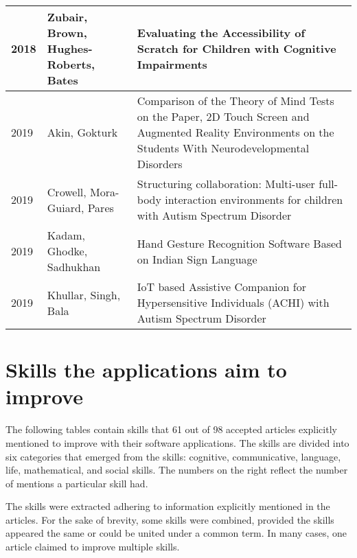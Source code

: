 \documentclass[utf8,english]{gradu3}
\begin{document}
\begin{longtable}{|>{\scriptsize}l|>{\scriptsize}p{3cm}|>{\scriptsize}p{10.4cm}|}
  2018          & Zubair, Brown, Hughes-Roberts, Bates                         & Evaluating the Accessibility of Scratch for Children with Cognitive Impairments                                                                                                                                                \\ \hline
  2019          & Akin, Gokturk                                                & Comparison of the Theory of Mind Tests on the Paper, 2D Touch Screen and Augmented Reality Environments on the Students With Neurodevelopmental Disorders                                                                      \\ \hline
  2019          & Crowell, Mora-Guiard, Pares                                  & Structuring collaboration: Multi-user full-body interaction environments for children with Autism Spectrum Disorder                                                                                                            \\ \hline
  2019          & Kadam, Ghodke, Sadhukhan                                     & Hand Gesture Recognition Software Based on Indian Sign Language                                                                                                                                                                \\ \hline
  2019          & Khullar, Singh, Bala                                         & IoT based Assistive Companion for Hypersensitive Individuals (ACHI) with Autism Spectrum Disorder                                                                                                                              \\
\end{longtable}

\section{Skills the applications aim to improve} \label{appendixC}

\begin{footnotesize}
  The following tables contain skills that 61 out of 98 accepted articles
  explicitly mentioned to improve with their software applications.
  The skills are divided into six categories that emerged from the skills:
  cognitive, communicative, language, life, mathematical, and social skills.
  The numbers on the right reflect the number of mentions a particular skill had.

  The skills were extracted adhering to information explicitly mentioned
  in the articles. For the sake of brevity, some skills were combined,
  provided the skills appeared the same or could be united under a
  common term. In many cases, one article claimed to improve multiple skills.
\end{footnotesize}
\end{document}
